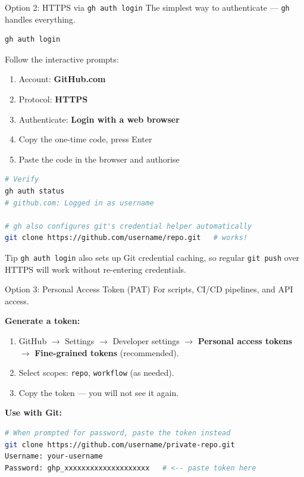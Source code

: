 \documentclass[aspectratio=169, 11pt]{beamer}
\begin{document}
\begin{frame}[fragile]{Option 2: HTTPS via \texttt{gh auth login}}
  The simplest way to authenticate --- \texttt{gh} handles everything.

  \begin{lstlisting}[language=bash]
gh auth login
  \end{lstlisting}

  Follow the interactive prompts:
  \begin{enumerate}
    \item Account: \textbf{GitHub.com}
    \item Protocol: \textbf{HTTPS}
    \item Authenticate: \textbf{Login with a web browser}
    \item Copy the one-time code, press Enter
    \item Paste the code in the browser and authorise
  \end{enumerate}

  \vspace{0.3em}
  \begin{lstlisting}[language=bash]
# Verify
gh auth status
# github.com: Logged in as username

# gh also configures git's credential helper automatically
git clone https://github.com/username/repo.git   # works!
  \end{lstlisting}

  \begin{block}{Tip}
    \texttt{gh auth login} also sets up Git credential caching, so regular \texttt{git push} over HTTPS will work without re-entering credentials.
  \end{block}
\end{frame}

\begin{frame}[fragile]{Option 3: Personal Access Token (PAT)}
  For scripts, CI/CD pipelines, and API access.

  \vspace{0.3em}
  \textbf{Generate a token:}
  \begin{enumerate}
    \item GitHub $\to$ Settings $\to$ Developer settings $\to$ \textbf{Personal access tokens} $\to$ \textbf{Fine-grained tokens} (recommended).
    \item Select scopes: \texttt{repo}, \texttt{workflow} (as needed).
    \item Copy the token --- you will not see it again.
  \end{enumerate}

  \textbf{Use with Git:}
  \begin{lstlisting}[language=bash]
# When prompted for password, paste the token instead
git clone https://github.com/username/private-repo.git
Username: your-username
Password: ghp_xxxxxxxxxxxxxxxxxxxx   # <-- paste token here
  \end{lstlisting}
\end{frame}
\end{document}
